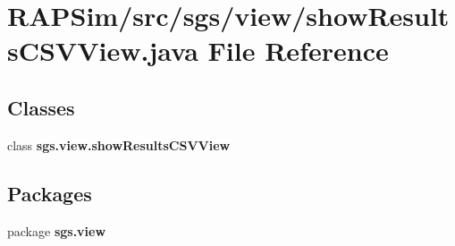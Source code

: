 \section{R\-A\-P\-Sim/src/sgs/view/show\-Results\-C\-S\-V\-View.java File Reference}
\label{show_results_c_s_v_view_8java}
\subsection*{Classes}
\begin{DoxyCompactItemize}
\item 
class {\bf sgs.\-view.\-show\-Results\-C\-S\-V\-View}
\end{DoxyCompactItemize}
\subsection*{Packages}
\begin{DoxyCompactItemize}
\item 
package {\bf sgs.\-view}
\end{DoxyCompactItemize}
